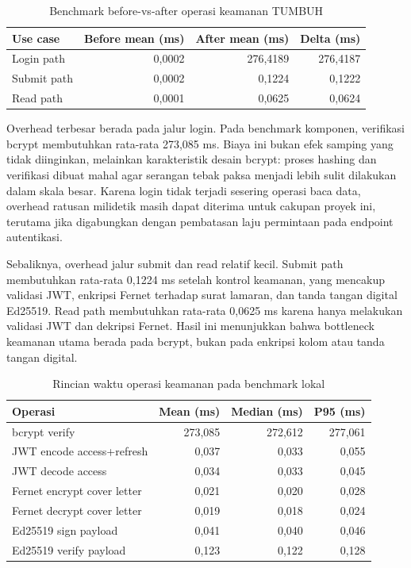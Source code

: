 \documentclass[12pt,a4paper]{article}
\begin{document}
\begin{table}[H]
  \caption{Benchmark before-vs-after operasi keamanan TUMBUH}
  \label{tab:perf}
  \centering
  \begin{tabularx}{\textwidth}{X r r r}
    \toprule
    Use case & Before mean (ms) & After mean (ms) & Delta (ms) \\
    \midrule
    Login path  & 0,0002 & 276,4189 & 276,4187 \\
    Submit path & 0,0002 & 0,1224   & 0,1222 \\
    Read path   & 0,0001 & 0,0625   & 0,0624 \\
    \bottomrule
  \end{tabularx}
\end{table}

Overhead terbesar berada pada jalur login. Pada benchmark komponen,
verifikasi bcrypt membutuhkan rata-rata 273,085 ms. Biaya ini bukan
efek samping yang tidak diinginkan, melainkan karakteristik desain
bcrypt: proses hashing dan verifikasi dibuat mahal agar serangan tebak
paksa menjadi lebih sulit dilakukan dalam skala besar. Karena login
tidak terjadi sesering operasi baca data, overhead ratusan milidetik
masih dapat diterima untuk cakupan proyek ini, terutama jika digabungkan
dengan pembatasan laju permintaan pada endpoint autentikasi.

Sebaliknya, overhead jalur submit dan read relatif kecil. Submit path
membutuhkan rata-rata 0,1224 ms setelah kontrol keamanan, yang mencakup
validasi JWT, enkripsi Fernet terhadap surat lamaran, dan tanda tangan
digital Ed25519. Read path membutuhkan rata-rata 0,0625 ms karena hanya
melakukan validasi JWT dan dekripsi Fernet. Hasil ini menunjukkan bahwa
bottleneck keamanan utama berada pada bcrypt, bukan pada enkripsi kolom
atau tanda tangan digital.

\begin{table}[H]
  \caption{Rincian waktu operasi keamanan pada benchmark lokal}
  \label{tab:perfdetail}
  \centering
  \begin{tabularx}{\textwidth}{X r r r}
    \toprule
    Operasi & Mean (ms) & Median (ms) & P95 (ms) \\
    \midrule
    bcrypt verify & 273,085 & 272,612 & 277,061 \\
    JWT encode access+refresh & 0,037 & 0,033 & 0,055 \\
    JWT decode access & 0,034 & 0,033 & 0,045 \\
    Fernet encrypt cover letter & 0,021 & 0,020 & 0,028 \\
    Fernet decrypt cover letter & 0,019 & 0,018 & 0,024 \\
    Ed25519 sign payload & 0,041 & 0,040 & 0,046 \\
    Ed25519 verify payload & 0,123 & 0,122 & 0,128 \\
    \bottomrule
  \end{tabularx}
\end{table}
\end{document}

